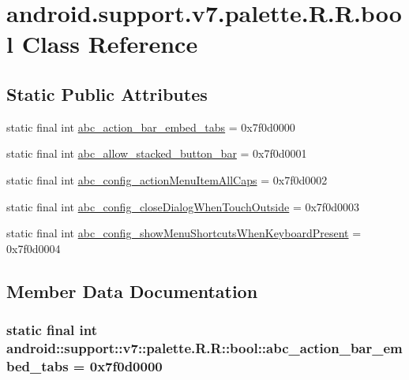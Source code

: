 \hypertarget{classandroid_1_1support_1_1v7_1_1palette_1_1_r_1_1bool}{
\section{android.support.v7.palette.R.R.bool Class Reference}
\label{classandroid_1_1support_1_1v7_1_1palette_1_1_r_1_1bool}
}
\subsection*{Static Public Attributes}
\begin{CompactItemize}
\item 
static final int \hyperlink{classandroid_1_1support_1_1v7_1_1palette_1_1_r_1_1bool_ca6a1bc6aa83c069cc0a0f7328721a7e}{abc\_\-action\_\-bar\_\-embed\_\-tabs} = 0x7f0d0000
\item 
static final int \hyperlink{classandroid_1_1support_1_1v7_1_1palette_1_1_r_1_1bool_3ff5ede6bbbf6cf4b1001564a1600ea1}{abc\_\-allow\_\-stacked\_\-button\_\-bar} = 0x7f0d0001
\item 
static final int \hyperlink{classandroid_1_1support_1_1v7_1_1palette_1_1_r_1_1bool_6f184473dae7e695ba2cb2ef6ed29e89}{abc\_\-config\_\-actionMenuItemAllCaps} = 0x7f0d0002
\item 
static final int \hyperlink{classandroid_1_1support_1_1v7_1_1palette_1_1_r_1_1bool_1b4c68d4afe1f156d7d68dbe99996b09}{abc\_\-config\_\-closeDialogWhenTouchOutside} = 0x7f0d0003
\item 
static final int \hyperlink{classandroid_1_1support_1_1v7_1_1palette_1_1_r_1_1bool_a8b599c2a17a9b76f1a2f4eae69e65f4}{abc\_\-config\_\-showMenuShortcutsWhenKeyboardPresent} = 0x7f0d0004
\end{CompactItemize}


\subsection{Member Data Documentation}
\hypertarget{classandroid_1_1support_1_1v7_1_1palette_1_1_r_1_1bool_ca6a1bc6aa83c069cc0a0f7328721a7e}{
\subsubsection[{abc\_\-action\_\-bar\_\-embed\_\-tabs}]{\setlength{\rightskip}{0pt plus 5cm}static final int android::support::v7::palette.R.R::bool::abc\_\-action\_\-bar\_\-embed\_\-tabs = 0x7f0d0000}}
\label{classandroid_1_1support_1_1v7_1_1palette_1_1_r_1_1bool_ca6a1bc6aa83c069cc0a0f7328721a7e}


